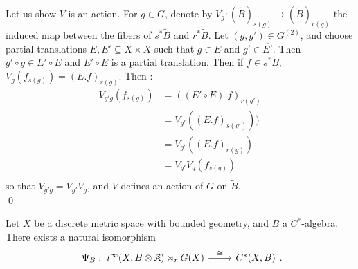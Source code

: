 \begin{dem}
Let us show $V$ is an action. For $g\in G$, denote by $V_g : (\tilde B)_{s(g)}\rightarrow (\tilde B)_{r(g)}$ the induced map between the fibers of $s^*\tilde B$ and $r^*\tilde B$. Let $(g,g')\in G^{(2)}$, and choose partial translations $E, E'\subseteq X\times X$ such that $g\in \overline E$ and $g'\in \overline{E'}$. Then $g'\circ g\in \overline{E'\circ E}$ and $E'\circ E$ is a partial translation. Then if $f\in s^* \tilde B$, $V_g(f_{s(g)}) = (E.f)_{r(g)}$. Then :
\[ \begin{array}{rl}
V_{g'g}(f_{s(g)}) & = ((E'\circ E).f)_{r(g')}         \\
		& = V_{g'}((E.f)_{s(g')})) \\
		& = V_{g'} ((E.f)_{r(g)})  \\
		& = V_{g'} V_{g} (f_{s(g)}) \\
\end{array}\]
so that $V_{g'g}= V_{g'} V_g$, and $V$ defines an action of $G$ on $\tilde B$.\\
\qed
\end{dem}

\begin{thm}\label{IsomCoarseGroupoid}
Let $X$ be a discrete metric space with bounded geometry, and $B$ a $C^*$-algebra. There exists a natural isomorphism 
\[\begin{tikzcd}\Psi_B :  \ l^\infty(X,B\otimes\mathfrak K)\rtimes_r G(X) \arrow{r}{\cong} &   C^*(X,B)\end{tikzcd}.\] 
\end{thm}

